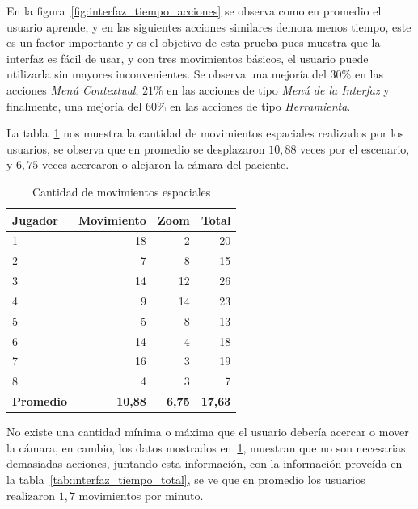 En la figura~\ref{fig:interfaz_tiempo_acciones} se observa como en promedio el
usuario aprende, y en las siguientes acciones similares demora menos tiempo,
este es un factor importante y es el objetivo de esta prueba pues muestra que la
interfaz es fácil de usar, y con tres movimientos básicos, el usuario puede
utilizarla sin mayores inconvenientes. Se observa una mejoría del $30\%$ en las
acciones \emph{Menú Contextual}, $21\%$ en las acciones de tipo \emph{Menú de la
    Interfaz} y finalmente, una mejoría del $60\%$ en las acciones de tipo
\emph{Herramienta}.


La tabla~\ref{tab:interfaz_cantidad_espaciales} nos muestra la cantidad de
movimientos espaciales realizados por los usuarios, se observa que en promedio
se desplazaron $10,88$ veces por el escenario, y $6,75$ veces acercaron o
alejaron la cámara del paciente.

\begin{table}[H]
\centering
\begin{tabular}{lrrr}
\toprule
\textbf{Jugador}  & \textbf{Movimiento} & \textbf{Zoom} & \textbf{Total} \\
\midrule
1        & 18         & 2    & 20 \\
2        & 7          & 8    & 15 \\
3        & 14         & 12   & 26 \\
4        & 9          & 14   & 23 \\
5        & 5          & 8    & 13 \\
6        & 14         & 4    & 18 \\
7        & 16         & 3    & 19 \\
8        & 4          & 3    &  7 \\
\midrule
\textbf{Promedio} & \textbf{10,88}      & \textbf{6,75} & \textbf{17,63} \\
\bottomrule
\end{tabular}
\caption{Cantidad de movimientos espaciales}
\label{tab:interfaz_cantidad_espaciales}
\end{table}

No existe una cantidad mínima o máxima que el usuario debería acercar o mover la
cámara, en cambio, los datos mostrados en~\ref{tab:interfaz_cantidad_espaciales},
muestran que no son necesarias demasiadas acciones, juntando esta información,
con la información proveída en la tabla~\ref{tab:interfaz_tiempo_total}, se ve
que en promedio los usuarios realizaron $1,7$ movimientos por minuto.

